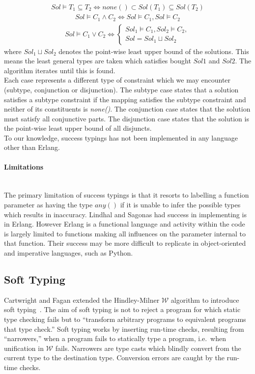 \documentclass[12pt, titlepage]{article}
\begin{document}
\begin{align*} 
	Sol \models T_1 \subseteq T_2 \iff none() \subset Sol(T_1) \subseteq Sol(T_2)
\end{align*}
\begin{align*} 
	Sol \models C_1 \land C_2 \iff Sol \models C_1, Sol \models  C_2
\end{align*}
\begin{align*} 
	Sol \models C_1 \lor C_2 \iff \begin{cases} Sol_1 \models C_1, Sol_2 \models C_2, \\
	                                            Sol = Sol_1 \sqcup Sol_2 \end{cases}
\end{align*}
where $Sol_1 \sqcup Sol_2$ denotes the point-wise least upper bound of the solutions. This means the least general types are taken which satisfies bought $Sol1$ and $Sol2$. The algorithm iterates until this is found. \\
\indent Each case represents a different type of constraint which we may encounter (subtype, conjunction or disjunction). The subtype case states that a solution satisfies a subtype constraint if the mapping satisfies the subtype constraint and neither of its constituents is \textit{none()}. The conjunction case states that the solution must satisfy all conjunctive parts. The disjunction case states that the solution is the point-wise least upper bound of all disjuncts. \\
\indent To our knowledge, success typings has not been implemented in any language other than Erlang.
\paragraph{Limitations}\mbox{} \\
The primary limitation of success typings is that it resorts to labelling a function parameter as having the type $any()$ if it is unable to infer the possible types which results in inaccuracy. Lindhal and Sagonas had success in implementing is in Erlang. However Erlang is a functional language and activity within the code is largely limited to functions making all influences on the parameter internal to that function. Their success may be more difficult to replicate in object-oriented and imperative languages, such as Python.


\subsection{Soft Typing}
Cartwright and Fagan extended the Hindley-Milner $\mathcal{W}$ algorithm to introduce soft typing~\cite{cartwright91}. The aim of soft typing is not to reject a program for which static type checking fails but to ``transform arbitrary programs to equivalent programs that type check.'' Soft typing works by inserting run-time checks, resulting from ``narrowers,'' when a program fails to statically type a program, i.e.\ when unification in $\mathcal{W}$ fails. Narrowers are type casts which blindly convert from the current type to the destination type. Conversion errors are caught by the run-time checks.
\end{document}
